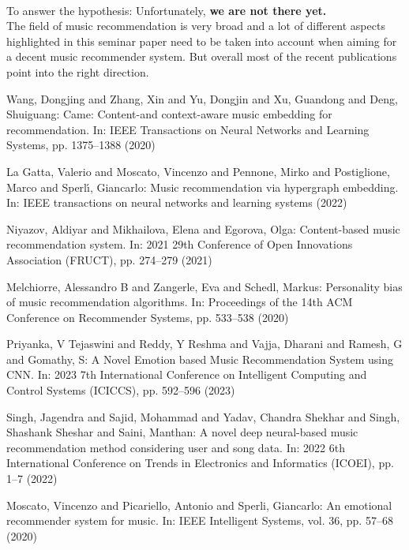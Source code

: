 \documentclass[runningheads,a4paper]{llncs}
\begin{document}
\\
To answer the hypothesis: 
Unfortunately, \textbf{we are not there yet.} \\
The field of music recommendation is very broad and a lot of different aspects highlighted in this seminar paper need to be taken into account when aiming for a decent music recommender system.
But overall most of the recent publications point into the right direction.  
\begin{thebibliography}{4}

 Wang, Dongjing and Zhang, Xin and Yu, Dongjin and Xu, Guandong and Deng, Shuiguang: 
Came: Content-and context-aware music embedding for recommendation. In: IEEE Transactions on Neural Networks and Learning Systems,
pp. 1375--1388 (2020)

 La Gatta, Valerio and Moscato, Vincenzo and Pennone, Mirko and Postiglione, Marco and Sperl{\'\i}, Giancarlo:
Music recommendation via hypergraph embedding. In: IEEE transactions on neural networks and learning systems (2022)

 Niyazov, Aldiyar and Mikhailova, Elena and Egorova, Olga:
Content-based music recommendation system. In: 2021 29th Conference of Open Innovations Association (FRUCT),
pp. 274--279 (2021)

 Melchiorre, Alessandro B and Zangerle, Eva and Schedl, Markus:
Personality bias of music recommendation algorithms. In: Proceedings of the 14th ACM Conference on Recommender Systems, 
pp. 533--538 (2020)

 Priyanka, V Tejaswini and Reddy, Y Reshma and Vajja, Dharani and Ramesh, G and Gomathy, S:
A Novel Emotion based Music Recommendation System using CNN. In: 2023 7th International Conference on Intelligent Computing and Control Systems (ICICCS),
pp. 592--596 (2023)

 Singh, Jagendra and Sajid, Mohammad and Yadav, Chandra Shekhar and Singh, Shashank Sheshar and Saini, Manthan:
A novel deep neural-based music recommendation method considering user and song data. In: 2022 6th International Conference on Trends in Electronics and Informatics (ICOEI),
pp. 1--7 (2022)

 Moscato, Vincenzo and Picariello, Antonio and Sperli, Giancarlo:
An emotional recommender system for music. In: IEEE Intelligent Systems, vol. 36, pp. 57--68 (2020)


\end{thebibliography}
\end{document}
